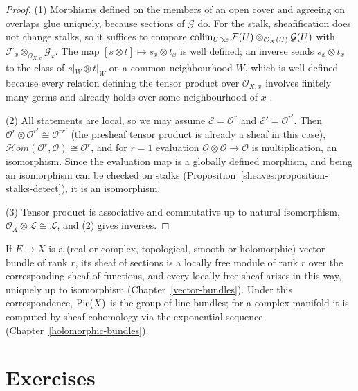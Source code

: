 \begin{proof}
(1) Morphisms defined on the members of an open cover and agreeing on overlaps glue uniquely, because sections of $\mathcal{G}$ do. For the stalk, sheafification does not change stalks,
so it suffices to compare $\operatorname*{colim}_{U \ni x}\mathcal{F}(U) \otimes_{\mathcal{O}_X(U)} \mathcal{G}(U)$ with $\mathcal{F}_x \otimes_{\mathcal{O}_{X,x}} \mathcal{G}_x$. The map
$[s \otimes t] \mapsto s_x \otimes t_x$ is well defined; an inverse sends $s_x \otimes t_x$ to the class of $s|_W \otimes t|_W$ on a common neighbourhood $W$, which is well defined because
every relation defining the tensor product over $\mathcal{O}_{X,x}$ involves finitely many germs and already holds over some neighbourhood of $x$ \cite[Chapter II, Section 5]{hartshorne-ag}.

(2) All statements are local, so we may assume $\mathcal{E} = \mathcal{O}^r$ and $\mathcal{E}' = \mathcal{O}^{r'}$. Then $\mathcal{O}^r \otimes \mathcal{O}^{r'} \cong \mathcal{O}^{rr'}$ (the
presheaf tensor product is already a sheaf in this case), $\mathcal{H}om(\mathcal{O}^r, \mathcal{O}) \cong \mathcal{O}^r$, and for $r = 1$ evaluation $\mathcal{O} \otimes \mathcal{O} \to \mathcal{O}$
is multiplication, an isomorphism. Since the evaluation map is a globally defined morphism, and being an isomorphism can be checked on stalks
(Proposition~\ref{sheaves:proposition-stalks-detect}), it is an isomorphism.

(3) Tensor product is associative and commutative up to natural isomorphism, $\mathcal{O}_X \otimes \mathcal{L} \cong \mathcal{L}$, and (2) gives inverses.
\end{proof}

\begin{remark}\label{sheaves:remark-vector-bundles}
If $E \to X$ is a (real or complex, topological, smooth or holomorphic) vector bundle of rank $r$, its sheaf of sections is a locally free module of rank $r$ over the corresponding
sheaf of functions, and every locally free sheaf arises in this way, uniquely up to isomorphism (Chapter~\ref{vector-bundles}). Under this correspondence, $\operatorname{Pic}(X)$ is the group of line
bundles; for a complex manifold it is computed by sheaf cohomology via the exponential sequence (Chapter~\ref{holomorphic-bundles}).
\end{remark}

\section{Exercises}\label{sheaves:section-exercises}

